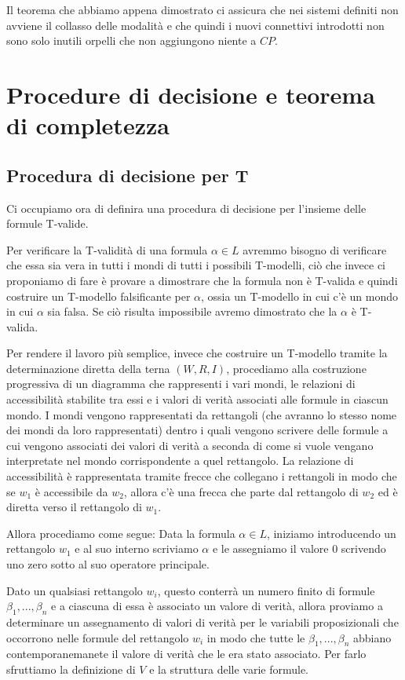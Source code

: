 \documentclass[a4paper, titlepage, 12pt]{report}
\begin{document}
Il teorema che abbiamo appena dimostrato ci assicura che nei sistemi definiti non avviene
il collasso delle modalità e che quindi i nuovi connettivi introdotti non sono solo inutili
orpelli che non aggiungono niente a $CP$.

\chapter{Procedure di decisione e teorema di completezza}

\section{Procedura di decisione per T}
Ci occupiamo ora di definira una procedura di decisione per l'insieme delle formule T-valide.

Per verificare la T-validità di una formula $\alpha \in L$ avremmo bisogno di verificare che essa sia vera in tutti
i mondi di tutti i possibili T-modelli, ciò che invece ci proponiamo di fare è
provare a dimostrare che la formula non è T-valida e quindi costruire un T-modello
falsificante per $\alpha$, ossia un T-modello in cui c'è un mondo in cui $\alpha$ sia falsa.
Se ciò risulta impossibile avremo dimostrato che la $\alpha$ è T-valida.

Per rendere il lavoro più semplice, invece che costruire un T-modello
tramite la determinazione diretta della terna $(W, R, I)$, procediamo alla costruzione
progressiva di un diagramma che rappresenti i vari mondi, le relazioni di accessibilità
stabilite tra essi e i valori di verità associati alle formule in ciascun mondo.
I mondi vengono rappresentati da rettangoli (che avranno lo stesso nome dei mondi
da loro rappresentati) dentro i quali
vengono scrivere delle formule a cui vengono associati
dei valori di verità a seconda di come si vuole vengano interpretate nel mondo
corrispondente a quel rettangolo. La relazione di accessibilità è rappresentata
tramite frecce che collegano i rettangoli in modo che se $w_1$ è accessibile da $w_2$,
allora c'è una frecca che parte dal rettangolo di $w_2$ ed è diretta verso il rettangolo
di $w_1$.


Allora procediamo come segue:
Data la formula $\alpha \in L$, iniziamo introducendo un rettangolo $w_1$ e
al suo interno scriviamo $\alpha$ e le assegniamo il valore $0$ scrivendo uno zero
sotto al suo operatore principale.

Dato un qualsiasi rettangolo $w_i$, questo conterrà un numero finito di formule
$\beta_1, ..., \beta_n$
e a ciascuna di essa è associato un valore di verità, allora proviamo
a determinare un assegnamento di valori di verità per le variabili proposizionali
che occorrono nelle formule del rettangolo $w_i$
in modo che tutte le $\beta_1, ..., \beta_n$
abbiano contemporanemanete il valore di verità che le era stato associato.
Per farlo sfruttiamo la definizione di $V$ e la struttura delle varie formule.
\end{document}
